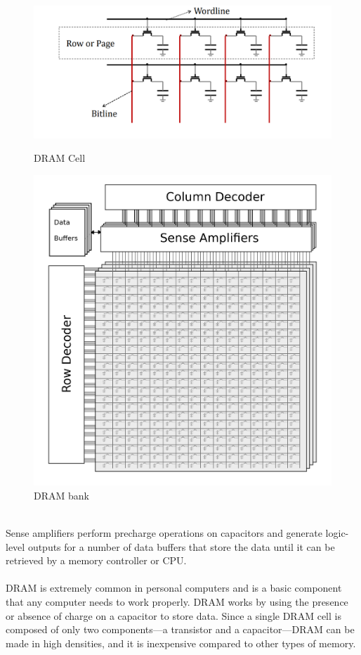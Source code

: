 \documentclass[11pt, conference, onecolumn]{IEEEtran}
\begin{document}
\begin{figure}[!tbp]
  \centering
  \begin{minipage}[b]{0.4\textwidth}
    \includegraphics[width=\textwidth]{dramcell.png}
    \caption{DRAM Cell}
  \end{minipage}
  \hfill
  \begin{minipage}[b]{0.4\textwidth}
    \includegraphics[width=\textwidth]{bank.png}
    \caption{DRAM bank}
  \end{minipage}
\end{figure}
\\Sense amplifiers perform precharge operations on capacitors and generate logic-level outputs for a number of data buffers that store the data until it can be retrieved by a memory controller or CPU.\\
\\DRAM is extremely common in personal computers and is a basic component that any computer needs to work properly. DRAM works by using the presence or absence of charge on a capacitor to store data. Since a single DRAM cell is composed of only two
components—a transistor and a capacitor—DRAM can be made in high densities, and it is inexpensive compared to other types of memory.\cite{b1}
\\
\\
\end{document}
